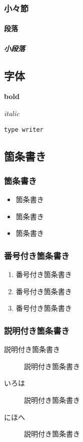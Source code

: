 \documentclass[main]{subfiles}
\begin{document}
\subsubsection*{小々節}

\paragraph*{段落}
\jalipsumiroha

\subparagraph*{小段落}
\jalipsumiroha


\subsection{字体}

\textbf{bold}

\textit{italic}

\texttt{type writer}



\subsection{箇条書き}

\subsubsection{箇条書き}
\begin{itemize}
  \item 箇条書き
  \item 箇条書き
  \item 箇条書き
\end{itemize}


\subsubsection{番号付き箇条書き}
\begin{enumerate}
  \item 番号付き箇条書き
  \item 番号付き箇条書き
  \item 番号付き箇条書き
\end{enumerate}


\subsubsection{説明付き箇条書き}
\begin{description}
  \item[説明付き箇条書き] 説明付き箇条書き
  \item[いろは] 説明付き箇条書き
  \item[にほへ] 説明付き箇条書き
\end{description}
\end{document}
